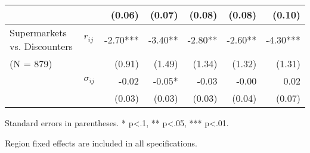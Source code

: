 \documentclass[english]{article}
\begin{document}
\begin{table}[hbtp]
\begin{threeparttable}
\begin{tabular}{llrrrrr}
          &       & (0.06) & (0.07) & (0.08) & (0.08) & (0.10) \\
\midrule
    \multicolumn{1}{l}{Supermarkets vs. Discounters} & \multicolumn{1}{l}{$r_{ij}$} & -2.70*** & -3.40** & -2.80** & -2.60** & -4.30*** \\
    \multicolumn{1}{l}{(N = 879)} &       & (0.91) & (1.49) & (1.34) & (1.32) & (1.31) \\
          & \multicolumn{1}{l}{$\sigma_{ij}$} & -0.02 & -0.05* & -0.03 & -0.00 & 0.02 \\
          &       & (0.03) & (0.03) & (0.03) & (0.04) & (0.07) \\
\bottomrule
\bottomrule
\end{tabular}
\begin{tablenotes}
      \small
      \item Standard errors in parentheses. * p<.1, ** p<.05, *** p<.01.
      \item Region fixed effects are included in all specifications.
\end{tablenotes}
\end{threeparttable}
\end{table}
\end{document}
